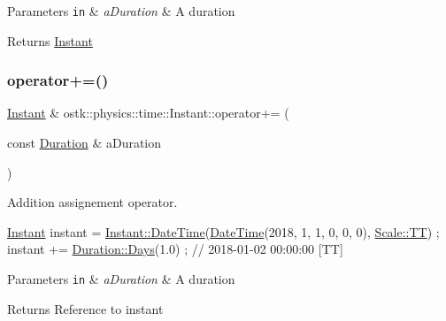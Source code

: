 \begin{DoxyParams}[1]{Parameters}
\mbox{\tt in}  & {\em a\+Duration} & A duration \\
\hline
\end{DoxyParams}
\begin{DoxyReturn}{Returns}
\hyperlink{classostk_1_1physics_1_1time_1_1_instant}{Instant} 
\end{DoxyReturn}
\mbox{\label{classostk_1_1physics_1_1time_1_1_instant_a48ba0a7bd60a02b7c7f989adc9a451cb}} 
\subsubsection{\texorpdfstring{operator+=()}{operator+=()}}
{\footnotesize\ttfamily \hyperlink{classostk_1_1physics_1_1time_1_1_instant}{Instant} \& ostk\+::physics\+::time\+::\+Instant\+::operator+= (\begin{DoxyParamCaption}\item[{const \hyperlink{classostk_1_1physics_1_1time_1_1_duration}{Duration} \&}]{a\+Duration }\end{DoxyParamCaption})}



Addition assignement operator. 


\begin{DoxyCode}
\hyperlink{classostk_1_1physics_1_1time_1_1_instant_a132c1e4b2fe9a9a671109206e297bd5d}{Instant} instant = \hyperlink{classostk_1_1physics_1_1time_1_1_instant_afd5725574a02389b80fad4baff313c8a}{Instant::DateTime}(\hyperlink{classostk_1_1physics_1_1time_1_1_instant_afd5725574a02389b80fad4baff313c8a}{DateTime}(2018, 1, 1, 0, 0, 0), 
      \hyperlink{namespaceostk_1_1physics_1_1time_adf23d37bd8641fb76a0e98ab46a70df7adf1f3edb9115acb0a1e04209b7a9937b}{Scale::TT}) ;
instant += \hyperlink{classostk_1_1physics_1_1time_1_1_duration_aefb4abc87c6957d00650228d069fa1e1}{Duration::Days}(1.0) ; \textcolor{comment}{// 2018-01-02 00:00:00 [TT]}
\end{DoxyCode}



\begin{DoxyParams}[1]{Parameters}
\mbox{\tt in}  & {\em a\+Duration} & A duration \\
\hline
\end{DoxyParams}
\begin{DoxyReturn}{Returns}
Reference to instant 
\end{DoxyReturn}
\mbox{\label{classostk_1_1physics_1_1time_1_1_instant_acda8b20c4ab0c89b717cf11d750767bc}} 
